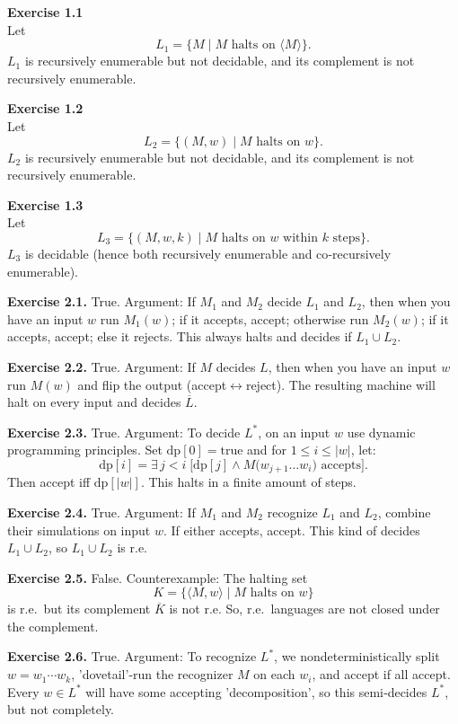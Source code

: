 \documentclass{article}
\theoremstyle{theorem}
\theoremstyle{definition}
\theoremstyle{remark}
\begin{document}
\textbf{Exercise 1.1}\\
Let 
\[
L_1 = \{M \mid M\text{ halts on }\langle M\rangle\}.
\]
\(L_1\) is recursively enumerable but not decidable, and its complement is not recursively enumerable.

\textbf{Exercise 1.2}\\
Let 
\[
L_2 = \{(M,w) \mid M\text{ halts on }w\}.
\]
\(L_2\) is recursively enumerable but not decidable, and its complement is not recursively enumerable.

\textbf{Exercise 1.3}\\
Let 
\[
L_3 = \{(M,w,k)\mid M\text{ halts on }w\text{ within }k\text{ steps}\}.
\]
\(L_3\) is decidable (hence both recursively enumerable and co‑recursively enumerable).

\textbf{Exercise 2.1.} True. Argument: If \(M_1\) and \(M_2\) decide \(L_1\) and \(L_2\), then when you have an input \(w\) run \(M_1(w)\); if it accepts, accept; otherwise run \(M_2(w)\); if it accepts, accept; else it rejects. This always halts and decides if \(L_1\cup L_2\).

\textbf{Exercise 2.2.} True. Argument: If \(M\) decides \(L\), then when you have an input \(w\) run \(M(w)\) and flip the output (accept\(\leftrightarrow\)reject). The resulting machine will halt on every input and decides \(\overline L\).

\textbf{Exercise 2.3.} True. Argument: To decide \(L^*\), on an input \(w\) use dynamic programming principles. Set \(\mathrm{dp}[0]=\text{true}\) and for \(1\le i\le|w|\), let:
\[
\mathrm{dp}[i] = \exists\,j<i\;\bigl[\mathrm{dp}[j]\land M\bigl(w_{j+1}\dots w_i\bigr)\text{ accepts}\bigr].
\]
Then accept iff \(\mathrm{dp}[|w|]\). This halts in a finite amount of steps.

\textbf{Exercise 2.4.} True. Argument: If \(M_1\) and \(M_2\) recognize \(L_1\) and \(L_2\), combine their simulations on input \(w\). If either accepts, accept. This kind of decides \(L_1\cup L_2\), so \(L_1\cup L_2\) is r.e.

\textbf{Exercise 2.5.} False. Counterexample: The halting set 
\[
K=\{\langle M,w\rangle\mid M\text{ halts on }w\}
\]
is r.e.\, but its complement \(\overline K\) is not r.e. So, r.e.\ languages are not closed under the complement.

\textbf{Exercise 2.6.} True. Argument: To recognize \(L^*\), we nondeterministically split \(w=w_1\cdots w_k\), 'dovetail'-run the recognizer \(M\) on each \(w_i\), and accept if all accept. Every \(w\in L^*\) will have some accepting 'decomposition', so this semi‑decides \(L^*\), but not completely.
\end{document}
